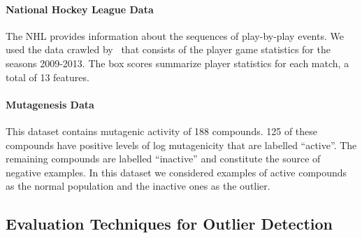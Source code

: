 {				%
				\paragraph{National Hockey League Data} 
				The NHL provides information about the sequences of play-by-play events. We used the data crawled by~\citep{schulte2014aggregating} that consists of the player game statistics for the seasons 2009-2013. The box scores summarize player statistics for each match, a total of 13 features. \\
				
				\paragraph{Mutagenesis Data}
				This dataset contains mutagenic activity of 188 compounds. 125 of these compounds have positive levels of log mutagenicity that are labelled ``active''.  The remaining compounds are labelled ``inactive'' and constitute the source of negative examples. In this dataset we considered examples of active compounds as the normal population and the inactive ones as the outlier. 
				
				\subsection{Evaluation Techniques for Outlier Detection}
				
}
